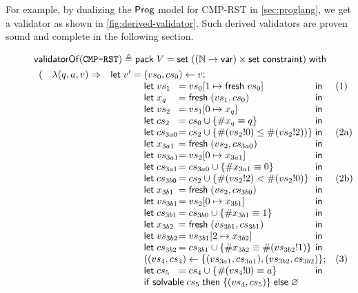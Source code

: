 For example, by dualizing the $\mathsf{Prog}$ model for CMP-RST in
\autoref{sec:proglang}, we get a validator as shown in
\autoref{fig:derived-validator}.  Such derived validators are proven sound and
complete in the following section.
\begin{figure}
\begin{align*}
&\validatorOf(\texttt{CMP-RST})\triangleq\existT{V}{\Set((\Nat\to\Var)\times\Set\constraint)}\\
  &\begin{array}{rll}
     (&\lam{(q,a,v)}{&\llet v'=\begin{array}[t]{@{}l@{}l@{}ll}
       \multicolumn{3}{@{}l}{(vs_0,cs_0)\gets v;}\\
       \letin{vs_1&}{\update{vs_0}{1}{\Fresh vs_0}&}&\text{(1)}\\
       \letin{x_q&}{\Fresh (vs_1,cs_0)&}\\
       \letin{vs_2&}{\update{vs_1}{0}{x_q}&}\\
       \letin{cs_2&}{cs_0\cup\{\#x_q\equiv q\}&}\\
       \letin{cs_{3a0}&}{cs_2\cup\{\#(vs_2!0)\le\#(vs_2!2))\}&}&\text{(2a)}\\
       \letin{x_{3a1}&}{\Fresh (vs_2,cs_{3a0})&}\\
       \letin{vs_{3a1}&}{\update{vs_2}{0}{x_{3a1}}&}\\
       \letin{cs_{3a1}&}{cs_{3a0}\cup\{\#x_{3a1}\equiv0\}&}\\
       \letin{cs_{3b0}&}{cs_2\cup\{\#(vs_2!2)<\#(vs_2!0)\}&}&\text{(2b)}\\
       \letin{x_{3b1}&}{\Fresh (vs_2,cs_{3b0})&}\\
       \letin{vs_{3b1}&}{\update{vs_2}{0}{x_{3b1}}&}\\
       \letin{cs_{3b1}&}{cs_{3b0}\cup\{\#x_{3b1}\equiv1\}&}\\
       \letin{x_{3b2}&}{\Fresh (vs_{3b1},cs_{3b1})&}\\
       \letin{vs_{3b2}&}{\update{vs_{3b1}}{2}{x_{3b2}}&}\\
       \letin{cs_{3b2}&}{cs_{3b1}\cup\{\#x_{3b2}\equiv\#(vs_{3b2}!1)\}&}\\
       \multicolumn{3}{@{}l}{((vs_4,cs_4)\gets\{(vs_{3a1},cs_{3a1}),(vs_{3b2},cs_{3b2})\};}&\text{(3)}\\
       \letin{cs_5&}{cs_4\cup\{\#(vs_4!0)\equiv a\}&}\\
       \multicolumn{3}{@{}l}{\If\solvable cs_5\Then\{(vs_4,cs_5)\}\Else\varnothing}\\
       \end{array}\\
}
\end{array}
\end{align*}
\end{figure}
